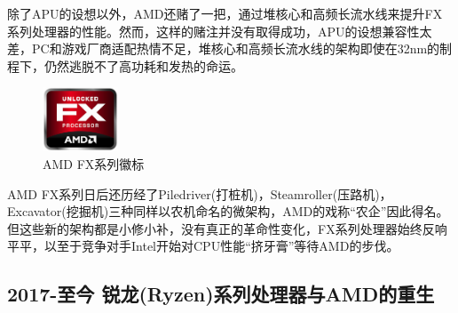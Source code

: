 \documentclass[UTF8]{ctexart}
\begin{document}
除了APU的设想以外，AMD还赌了一把，通过堆核心和高频长流水线来提升FX系列处理器的性能。然而，这样的赌注并没有取得成功，APU的设想兼容性太差，PC和游戏厂商适配热情不足，堆核心和高频长流水线的架构即使在32nm的制程下，仍然逃脱不了高功耗和发热的命运。
\begin{figure}[H]
    \begin{center}
        \includegraphics[width=0.2\textwidth]{figure/AMDFX.jpg}
        \caption{AMD FX系列徽标}
    \end{center}
\end{figure}
AMD FX系列日后还历经了Piledriver(打桩机)，Steamroller(压路机)，Excavator(挖掘机)三种同样以农机命名的微架构，AMD的戏称“农企”因此得名。但这些新的架构都是小修小补，没有真正的革命性变化，FX系列处理器始终反响平平，以至于竞争对手Intel开始对CPU性能“挤牙膏”等待AMD的步伐。


\subsection{2017-至今 锐龙(Ryzen)系列处理器与AMD的重生}
\end{document}
